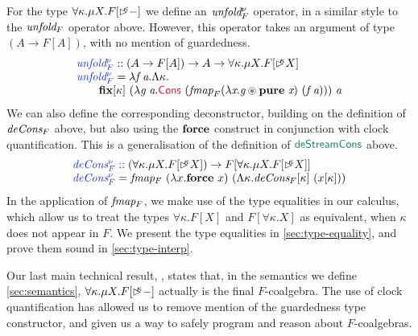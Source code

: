 For the type $\forall \kappa. \mu X. F[\mathord{\rhd\kern-0.4em^{\kappa}}-]$ we define an
$\textit{unfold$^\nu_F$}$ operator, in a similar style to the
$\textit{unfold$_F$}$ operator above. However, this operator takes an
argument of type $(A \to F[A])$, with no mention of guardedness.
\begin{displaymath}
  \begin{array}{l}
    \defn{unfold$^\nu_F$} :: (A \to F[A]) \to A \to \forall \kappa. \mu X. F[\delay\kappa X] \\
    \defn{unfold$^\nu_F$} = \lambda \ident{f}\ \ident{a}. \Lambda \kappa. \\
    \quad\quad\kw{fix}[\kappa]\ (\lambda \ident{g}\ \ident{a}. \cons{Cons}\ (\ident{fmap}_F (\lambda \ident{x}. \ident{g} \circledast \kw{pure}\ \ident{x})\ (\ident{f}\ \ident{a})))\ \ident{a}
  \end{array}
\end{displaymath}
We can also define the corresponding deconstructor, building on the
definition of $\textit{deCons$_F$}$ above, but also using the $\textbf{force}$
construct in conjunction with clock quantification. This is a
generalisation of the definition of $\elim{deStreamCons}$ above.
\begin{displaymath}
  \begin{array}{l}
    \defn{deCons$^\nu_F$} :: (\forall \kappa. \mu X. F[\delay\kappa X]) \to F[\forall \kappa. \mu X. F[\delay\kappa X]] \\
    \defn{deCons$^\nu_F$} = \ident{fmap$_F$}\ (\lambda x. \kw{force}\ x)\ (\Lambda \kappa. \ident{deCons$_F$}[\kappa]\ (x[\kappa]))
  \end{array}
\end{displaymath}
In the application of $\textit{fmap$_F$}$, we make use of the type
equalities in our calculus, which allow us to treat the types $\forall
\kappa. F[X]$ and $F[\forall \kappa. X]$ as equivalent, when $\kappa$
does not appear in $F$. We present the type equalities in
\autoref{sec:type-equality}, and prove them sound in
\autoref{sec:type-interp}.

Our last main technical result, , states
that, in the semantics we define \autoref{sec:semantics}, $\forall
\kappa. \mu X. F[\mathord{\rhd\kern-0.4em^{\kappa}}-]$ actually is the final
$F$-coalgebra. The use of clock quantification has allowed us to
remove mention of the guardedness type constructor, and given us a way
to safely program and reason about $F$-coalgebras.



